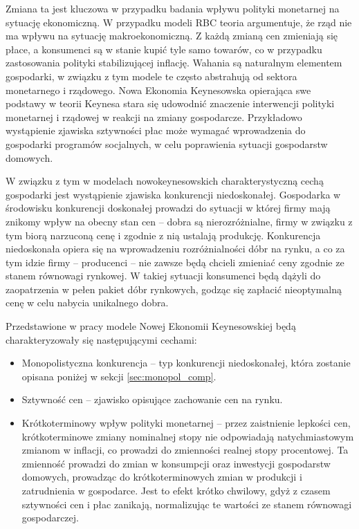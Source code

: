 Zmiana ta jest kluczowa w przypadku badania wpływu polityki monetarnej na sytuację ekonomiczną. W przypadku modeli RBC teoria argumentuje, że rząd nie ma wpływu na sytuację makroekonomiczną. Z każdą zmianą cen zmieniają się płace, a konsumenci są w stanie kupić tyle samo towarów, co w przypadku zastosowania polityki stabilizującej inflację. Wahania są naturalnym elementem gospodarki, w związku z tym modele te często abstrahują od sektora monetarnego i rządowego. Nowa Ekonomia Keynesowska opierająca swe podstawy w teorii Keynesa stara się udowodnić znaczenie interwencji polityki monetarnej i rządowej w reakcji na zmiany gospodarcze. Przykładowo wystąpienie zjawiska sztywności płac może wymagać wprowadzenia do gospodarki programów socjalnych, w celu poprawienia sytuacji gospodarstw domowych.

W związku z tym w modelach nowokeynesowskich charakterystyczną cechą gospodarki jest wystąpienie zjawiska konkurencji niedoskonałej. Gospodarka w środowisku konkurencji doskonałej prowadzi do sytuacji w której firmy mają znikomy wpływ na obecny stan cen -- dobra są nierozróżnialne, firmy w związku z tym biorą narzuconą cenę i zgodnie z nią ustalają produkcję. Konkurencja niedoskonała opiera się na wprowadzeniu rozróżnialności dóbr na rynku, a co za tym idzie firmy -- producenci -- nie zawsze będą chcieli zmieniać ceny zgodnie ze stanem równowagi rynkowej. W takiej sytuacji konsumenci będą dążyli do zaopatrzenia w pełen pakiet dóbr rynkowych, godząc się zapłacić nieoptymalną cenę w celu nabycia unikalnego dobra. 

Przedstawione w pracy modele Nowej Ekonomii Keynesowskiej będą charakteryzowały się następującymi cechami\cite{gali}:
\begin{itemize}
    \item Monopolistyczna konkurencja -- typ konkurencji niedoskonałej, która zostanie opisana poniżej w sekcji \ref{sec:monopol_comp}.
    \item Sztywność cen -- zjawisko opisujące zachowanie cen na rynku.
    \item Krótkoterminowy wpływ polityki monetarnej -- przez zaistnienie lepkości cen, krótkoterminowe zmiany nominalnej stopy nie odpowiadają natychmiastowym zmianom w inflacji, co prowadzi do zmienności realnej stopy procentowej. Ta zmienność prowadzi do zmian w konsumpcji oraz inwestycji gospodarstw domowych, prowadząc do krótkoterminowych zmian w produkcji i zatrudnienia w gospodarce. Jest to efekt krótko chwilowy, gdyż z czasem sztywności cen i płac zanikają, normalizując te wartości ze stanem równowagi gospodarczej.
\end{itemize}

